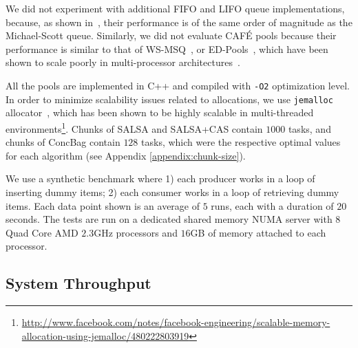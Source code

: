 We did not experiment with additional FIFO and LIFO queue implementations, because, as shown in~\cite{Sundell:2011:LAC:1989493.1989550}, their performance is of the same order of magnitude as the Michael-Scott queue. 
Similarly, we did not evaluate {CAF\'E}\cite{Basin:2011:CST:2075029.2075087} pools because their performance is similar to that of WS-MSQ~\cite{Basin:Thesis:2011}, or ED-Pools~\cite{Afek:2010:SPP:1885276.1885295}, which have been shown to scale poorly in multi-processor architectures~\cite{Basin:Thesis:2011,Sundell:2011:LAC:1989493.1989550}. 

All the pools are implemented in C++ and compiled with \texttt{-O2} optimization level. 
In order to minimize scalability issues related to allocations, we use \texttt{jemalloc} allocator~\cite{citeulike:4951109}, which has been shown to be highly scalable in multi-threaded environments\footnote{\url{http://www.facebook.com/notes/facebook-engineering/scalable-memory-allocation-using-jemalloc/480222803919}}.
Chunks of SALSA and SALSA+CAS contain $1000$ tasks, and chunks of ConcBag contain $128$ tasks, which were the respective optimal values for each algorithm (see Appendix \ref{appendix:chunk-size}). 

We use a synthetic benchmark where 1) each producer works in a loop of inserting dummy items; 2) each consumer works in a loop of retrieving dummy items. Each data point shown is an average of $5$ runs, each with a duration of $20$ seconds. 
The tests are run on a dedicated shared memory NUMA server with $8$ Quad Core AMD $2.3$GHz processors and $16$GB of memory attached to each processor. 
\negspace
\subsection{System Throughput}
\label{sec:eval-performance}

